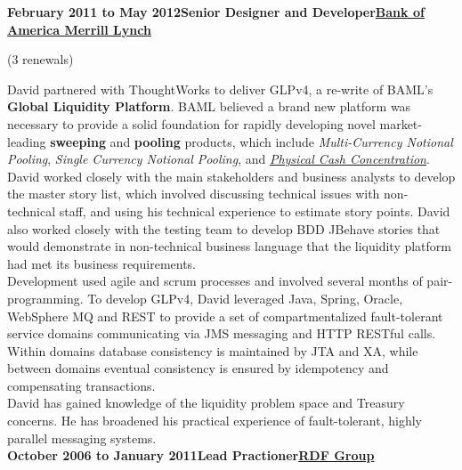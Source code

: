\documentclass[a4paper,12pt]{article}
\newcommand{\head}[1]{\begin{center}{\large{\textbf{\sc{#1}}}}\nopagebreak\end{center}}
\newcommand{\clientwork}[3]{\textbf{#1\hfill#3\hfill#2}\nopagebreak}
\newcommand{\renewals}[2]{(#2)\nopagebreak}
\begin{document}
\head{Career History}

\clientwork{February 2011 to May 2012}{\href{http://corp.bankofamerica.com/}{Bank of America Merrill Lynch}}{Senior Designer and Developer}

\renewals{15 months}{3 renewals}


David partnered with ThoughtWorks to deliver GLPv4, a re-write of BAML's \textbf{Global Liquidity Platform}. BAML believed a brand new platform was necessary to provide a solid foundation for rapidly developing novel market-leading \textbf{sweeping} and \textbf{pooling} products, which include \emph{Multi-Currency Notional Pooling}, \emph{Single Currency Notional Pooling}, and \emph{\href{http://www.marketwatch.com/story/bank-of-america-merrill-lynch-adds-physical-cash-concentration-to-global-liquidity-platform-2012-03-19}{Physical Cash Concentration}}.\\

David worked closely with the main stakeholders and business analysts to develop the master story list, which involved discussing technical issues with non-technical staff, and using his technical experience to estimate story points. David also worked closely with the testing team to develop BDD JBehave stories that would demonstrate in non-technical business language that the liquidity platform had met its business requirements.\\

Development used agile and scrum processes and involved several months of pair-programming. To develop GLPv4, David leveraged Java, Spring, Oracle, WebSphere MQ and REST to provide a set of compartmentalized fault-tolerant service domains communicating via JMS messaging and HTTP RESTful calls. Within domains database consistency is maintained by JTA and XA, while between domains eventual consistency is ensured by idempotency and compensating transactions.\\

David has gained knowledge of the liquidity problem space and Treasury concerns. He has broadened his practical experience of fault-tolerant, highly parallel messaging systems.\\

\clientwork{October 2006 to January 2011}{\href{http://www.rdfgroup.com/}{RDF Group}}{Lead Practioner}
\end{document}
